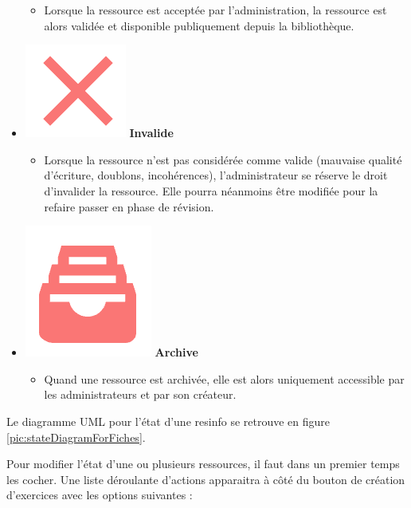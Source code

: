 \begin{itemize}
    \begin{itemize}
        \item Lorsque la ressource est acceptée par l'administration, la ressource est alors validée et disponible publiquement depuis la bibliothèque.
    \end{itemize} 
    \item \includegraphics[valign=b,height=1.4\fontcharht\font`X]{images/client/not-validated.png} \textbf{Invalide}
    \begin{itemize}
        \item Lorsque la ressource n'est pas considérée comme valide (mauvaise qualité d'écriture, doublons, incohérences), l'administrateur se réserve le droit d'invalider la ressource. Elle pourra néanmoins être modifiée pour la refaire passer en phase de révision.
    \end{itemize}
    \item \includegraphics[valign=b,height=1.4\fontcharht\font`X]{images/client/archive.png} \textbf{Archive}
    \begin{itemize}
        \item Quand une ressource est archivée, elle est alors uniquement accessible par les administrateurs et par son créateur.
    \end{itemize}
\end{itemize}

Le diagramme UML pour l'état d'une \gls{resinfo} se retrouve en figure \ref{pic:stateDiagramForFiches}.


Pour modifier l'état d'une ou plusieurs ressources, il faut dans un premier temps les cocher. Une liste déroulante d'actions apparaitra à côté du bouton de création d'exercices avec les options suivantes :

